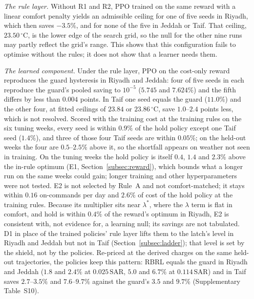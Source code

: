 \documentclass[pdflatex,sn-mathphys-num,iicol]{sn-jnl}
\theoremstyle{thmstyleone}\newtheorem{proposition}{Proposition}\newtheorem{corollary}{Corollary}
\theoremstyle{thmstyletwo}\newtheorem{remark}{Remark}\newtheorem{observation}{Observation}
\theoremstyle{thmstylethree}\newtheorem{definition}{Definition}
\newcommand{\SAR}{\text{SAR}}
\begin{document}
\emph{The rule layer.} Without R1 and R2, PPO trained on the same reward with a linear comfort penalty yields an admissible ceiling for one of five seeds in Riyadh, which then saves $-3.5\%$, and for none of the five in Jeddah or Taif. That ceiling, $23.50\,^\circ$C, is the lower edge of the search grid, so the null for the other nine runs may partly reflect the grid's range. This shows that this configuration fails to optimise without the rules; it does not show that a learner needs them.

\emph{The learned component.} Under the rule layer, PPO on the cost-only reward reproduces the guard hysteresis in Riyadh and Jeddah: four of five seeds in each reproduce the guard's pooled saving to $10^{-5}$ ($5.745$ and $7.624\%$) and the fifth differs by less than $0.004$ points. In Taif one seed equals the guard ($11.0\%$) and the other four, at fitted ceilings of $23.84$ or $23.86\,^\circ$C, save $1.0$--$2.4$ points less, which is not resolved. Scored with the training cost at the training rules on the six tuning weeks, every seed is within $0.9\%$ of the hold policy except one Taif seed ($1.4\%$), and three of those four Taif seeds are within $0.05\%$; on the held-out weeks the four are $0.5$--$2.5\%$ above it, so the shortfall appears on weather not seen in training. On the tuning weeks the hold policy is itself $0.4$, $1.4$ and $2.3\%$ above the in-rule optimum (E1, Section~\ref{subsec:reward}), which bounds what a longer run on the same weeks could gain; longer training and other hyperparameters were not tested. E2 is not selected by Rule~A and not comfort-matched; it stays within $0.16$ on-commands per day and $2.6\%$ of cost of the hold policy at the training rules. Because its multiplier sits near $\lambda^\ast$, where the $\lambda$ term is flat in comfort, and hold is within $0.4\%$ of the reward's optimum in Riyadh, E2 is consistent with, not evidence for, a learning null; its savings are not tabulated. D1 in place of the trained policies' rule layer lifts them to the latch's level in Riyadh and Jeddah but not in Taif (Section~\ref{subsec:ladder}); that level is set by the shield, not by the policies. Re-priced at the derived charges on the same held-out trajectories, the policies keep this pattern: RBRL equals the guard in Riyadh and Jeddah ($1.8$ and $2.4\%$ at $0.025\,\SAR$, $5.0$ and $6.7\%$ at $0.114\,\SAR$) and in Taif saves $2.7$--$3.5\%$ and $7.6$--$9.7\%$ against the guard's $3.5$ and $9.7\%$ (Supplementary Table~S10).
\end{document}
